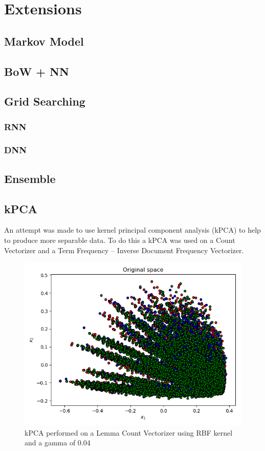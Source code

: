 \section{Extensions}
\label{sec:extensions}

  \subsection{Markov Model}
  \label{sec:markov_model}

  \subsection{BoW + NN}
  \label{sec:bow_nn}

  \subsection{Grid Searching}
  \label{sec:grid_search}

    \subsubsection{RNN}
    \label{sec:rnn_grid_search}

    \subsubsection{DNN}
    \label{sec:dnn_grid_search}

    \subsection{Ensemble}
    \label{sec:ensemble}

    \subsection{kPCA}
    \label{sec:kpca}
    An attempt was made to use kernel principal component analysis (kPCA) to help to produce more separable data. To do this a kPCA was used on a Count Vectorizer and a Term Frequency – Inverse Document Frequency Vectorizer.
    
    \begin{figure}[h]
\centering
\includegraphics[width=\columnwidth]{Figures/Extensions/kPCALemmaRBF.png}
\caption{kPCA performed on a Lemma Count Vectorizer using RBF kernel and a gamma of 0.04}
\label{fig:balance}
\end{figure}
    
    
    
  
